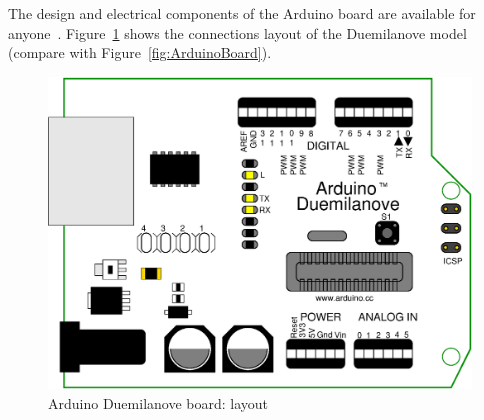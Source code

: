 The design and electrical components of the Arduino board are available for anyone~\cite{Arduino}. Figure~\ref{fig:Arduino_schematics} shows the connections layout of the Duemilanove model (compare with Figure~\ref{fig:ArduinoBoard}).

\begin{figure}[htbp]
  \centering
  \includegraphics[width=0.7\linewidth]{figures/duemilanove_layout.eps}
  \caption{Arduino Duemilanove board: layout
  \label{fig:Arduino_schematics}}
\end{figure}